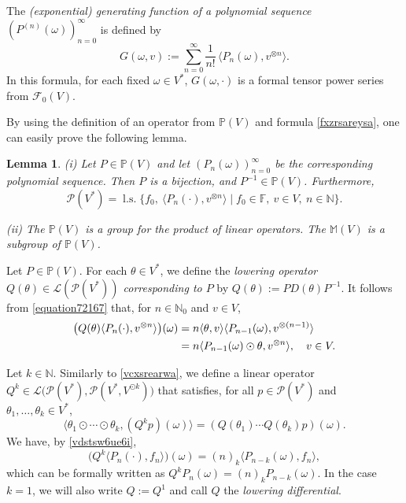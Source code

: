 \documentclass[12pt]{article}
\newtheorem{lemma}[theorem]{Lemma}
\theoremstyle{remark}
\theoremstyle{remark}
\theoremstyle{remark}
\begin{document}
 The {\it (exponential) generating function of a polynomial sequence
$(P^{(n)}(\omega))_{n=0}^\infty$} is defined by
$$G(\omega,v):= \sum_{n=0}^\infty \frac{1}{n!}\,\langle P_n(\omega),v^{\otimes n}\rangle. $$
In this formula, for each fixed $\omega\in V^*$, $G(\omega,\cdot)$ is a formal tensor power series from $\mathcal F_0(V)$. 


 By using the definition of an operator from $\mathbb P(V)$ and formula \eqref{fxzrsareysa}, one can easily prove the following lemma.  
 
 \begin{lemma}\label{vcfcfydy}
   {\rm (i)} Let $P\in\mathbb P(V)$ and let $(P_n(\omega))_{n=0}^\infty$ be the corresponding polynomial sequence. Then $P$ is a bijection, and   $P^{-1}\in\mathbb P(V)$. Furthermore,
    $$\mathcal P  (V^*)=\operatorname{l.s.}\big\{f_0,\ \langle P_n(\cdot),v^{\otimes n}\rangle \mid f_0\in\mathbb F,\ v\in V,\ n\in \mathbb{N}\big\}.
$$

{\rm (ii)} The $\mathbb P(V)$ is a group for the product of linear operators. The $\mathbb M(V)$ is a subgroup of $\mathbb P(V)$.
 \end{lemma}
 
  



 Let $P\in \mathbb P(V)$. For each $\theta\in V^*$, we define the {\it lowering operator $Q(\theta)\in \mathcal L(\mathcal P  (V^*))$ corresponding to $P$} by $Q(\theta ):=PD(\theta)P^{-1}$. It follows from \eqref{equation72167} that, for $n\in\mathbb N_0$ and $v\in V$,
  \begin{align}
  \big(Q(\theta)\langle P_n(\cdot),v^{\otimes n}\rangle\big)(\omega)&=n\langle \theta,v\rangle \langle P_{n-1}( \omega),v^{\otimes (n-1)}\rangle\notag\\
  & =n\langle P_{n-1}(\omega)\odot\theta,v^{\otimes n}\rangle,\quad v\in V.\notag\end{align} 

Let $k\in\mathbb N$. Similarly to \eqref{vcxsrearwa},  we define  a linear operator $Q^{k}\in\mathcal L\big(\mathcal P(V^*), \mathcal P(V^*,V^{\odot k})\big)$ that satisfies, for all $p\in\mathcal P(V^*)$ and $\theta_1,\dots,\theta_k \in V^*$,
\begin{equation}\label{cxrse5w354w5}
\big\langle \theta_1\odot\cdots\odot\theta_k,  (Q^{k} p)(\omega)\big\rangle =(Q(\theta_1)\dotsm Q(\theta_k)p)(\omega).
\end{equation} 
We have, by \eqref{vdstsw6ue6i},
\begin{equation}\label{ge4ew34wq43w}
\big(Q^{k}\langle P_n(\cdot),f_n\rangle\big)(\omega)=(n)_k\langle P_{n-k}(\omega),f_n\rangle,
\end{equation}
which can be formally written  as $Q^{k}P_n(\omega)=(n)_kP_{n-k}(\omega)$. In the case $k=1$, we will also write $Q:=Q^{1}$ and call $Q$ the {\it lowering differential}.
\end{document}
